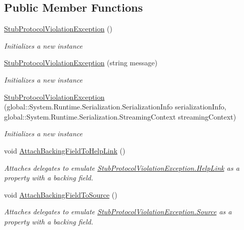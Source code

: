 \subsection*{Public Member Functions}
\begin{DoxyCompactItemize}
\item 
\hyperlink{class_system_1_1_net_1_1_fakes_1_1_stub_protocol_violation_exception_a9fa56379cee460f5adb6c1da5be12740}{Stub\-Protocol\-Violation\-Exception} ()
\begin{DoxyCompactList}\small\item\em Initializes a new instance\end{DoxyCompactList}\item 
\hyperlink{class_system_1_1_net_1_1_fakes_1_1_stub_protocol_violation_exception_a7edf9b6d818b935922dae72cd768179e}{Stub\-Protocol\-Violation\-Exception} (string message)
\begin{DoxyCompactList}\small\item\em Initializes a new instance\end{DoxyCompactList}\item 
\hyperlink{class_system_1_1_net_1_1_fakes_1_1_stub_protocol_violation_exception_ac6fff2a545a98fca8b5919d376018ef9}{Stub\-Protocol\-Violation\-Exception} (global\-::\-System.\-Runtime.\-Serialization.\-Serialization\-Info serialization\-Info, global\-::\-System.\-Runtime.\-Serialization.\-Streaming\-Context streaming\-Context)
\begin{DoxyCompactList}\small\item\em Initializes a new instance\end{DoxyCompactList}\item 
void \hyperlink{class_system_1_1_net_1_1_fakes_1_1_stub_protocol_violation_exception_ae810d5a8288cdf3f7cb92c0dddcaabd4}{Attach\-Backing\-Field\-To\-Help\-Link} ()
\begin{DoxyCompactList}\small\item\em Attaches delegates to emulate \hyperlink{class_system_1_1_net_1_1_fakes_1_1_stub_protocol_violation_exception_a9812873c1e3730c37137a8524ae61da0}{Stub\-Protocol\-Violation\-Exception.\-Help\-Link} as a property with a backing field.\end{DoxyCompactList}\item 
void \hyperlink{class_system_1_1_net_1_1_fakes_1_1_stub_protocol_violation_exception_aed08a0c4640bc0205d0c01c424d0230e}{Attach\-Backing\-Field\-To\-Source} ()
\begin{DoxyCompactList}\small\item\em Attaches delegates to emulate \hyperlink{class_system_1_1_net_1_1_fakes_1_1_stub_protocol_violation_exception_ad0f093a450534d5f90af6f1aa61cbae1}{Stub\-Protocol\-Violation\-Exception.\-Source} as a property with a backing field.\end{DoxyCompactList}\item 

\end{DoxyCompactItemize}
